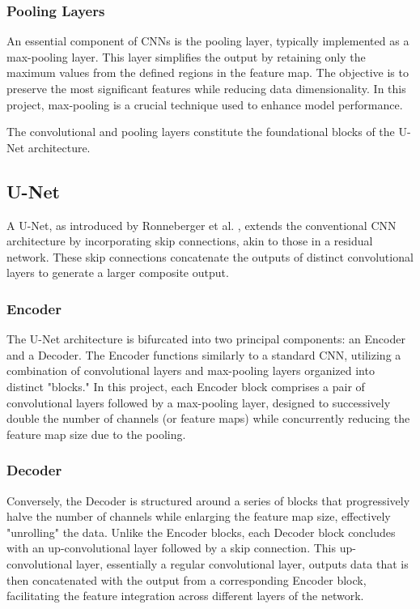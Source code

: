 \documentclass[12pt]{article}
\begin{document}
\subsubsection*{Pooling Layers}

An essential component of CNNs is the pooling layer, typically implemented as a max-pooling layer. This layer simplifies the output by retaining only the maximum values from the defined regions in the feature map. The objective is to preserve the most significant features while reducing data dimensionality. In this project, max-pooling is a crucial technique used to enhance model performance.

The convolutional and pooling layers constitute the foundational blocks of the U-Net architecture.

\subsection{U-Net}

A U-Net, as introduced by Ronneberger et al. \cite{ronneberger2015unet}, extends the conventional CNN architecture by incorporating skip connections, akin to those in a residual network. These skip connections concatenate the outputs of distinct convolutional layers to generate a larger composite output.

\subsubsection*{Encoder}

The U-Net architecture is bifurcated into two principal components: an Encoder and a Decoder. The Encoder functions similarly to a standard CNN, utilizing a combination of convolutional layers and max-pooling layers organized into distinct "blocks." In this project, each Encoder block comprises a pair of convolutional layers followed by a max-pooling layer, designed to successively double the number of channels (or feature maps) while concurrently reducing the feature map size due to the pooling.

\subsubsection*{Decoder}

Conversely, the Decoder is structured around a series of blocks that progressively halve the number of channels while enlarging the feature map size, effectively "unrolling" the data. Unlike the Encoder blocks, each Decoder block concludes with an up-convolutional layer followed by a skip connection. This up-convolutional layer, essentially a regular convolutional layer, outputs data that is then concatenated with the output from a corresponding Encoder block, facilitating the feature integration across different layers of the network.
\end{document}
